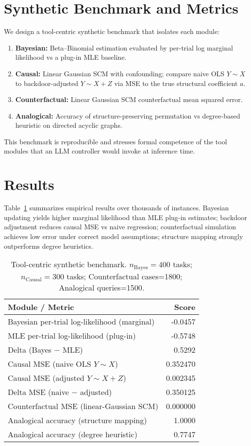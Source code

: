 \documentclass[11pt]{article}
\begin{document}
\section{Synthetic Benchmark and Metrics}
We design a tool-centric synthetic benchmark that isolates each module:
\begin{enumerate}
\item \textbf{Bayesian:} Beta--Binomial estimation evaluated by per-trial log marginal likelihood vs a plug-in MLE baseline.
\item \textbf{Causal:} Linear Gaussian SCM with confounding; compare naive OLS $Y\!\sim\!X$ to backdoor-adjusted $Y\!\sim\!X{+}Z$ via MSE to the true structural coefficient $a$.
\item \textbf{Counterfactual:} Linear Gaussian SCM counterfactual mean squared error.
\item \textbf{Analogical:} Accuracy of structure-preserving permutation vs degree-based heuristic on directed acyclic graphs.
\end{enumerate}
This benchmark is reproducible and stresses formal competence of the tool modules that an LLM controller would invoke at inference time.

\section{Results}
Table~\ref{tab:results} summarizes empirical results over thousands of instances. Bayesian updating yields higher marginal likelihood than MLE plug-in estimates; backdoor adjustment reduces causal MSE vs naive regression; counterfactual simulation achieves low error under correct model assumptions; structure mapping strongly outperforms degree heuristics.


\begin{table}[t]
\centering
\begin{tabular}{l r}
\toprule
\textbf{Module / Metric} & \textbf{Score} \\ \midrule
Bayesian per-trial log-likelihood (marginal) & -0.0457 \\
MLE per-trial log-likelihood (plug-in) & -0.5748 \\
Delta (Bayes $-$ MLE) & 0.5292 \\
Causal MSE (naive OLS $Y\!\sim\!X$) & 0.352470 \\
Causal MSE (adjusted $Y\!\sim\!X{+}Z$) & 0.002345 \\
Delta MSE (naive $-$ adjusted) & 0.350125 \\
Counterfactual MSE (linear-Gaussian SCM) & 0.000000 \\
Analogical accuracy (structure mapping) & 1.0000 \\
Analogical accuracy (degree heuristic) & 0.7747 \\
\bottomrule
\end{tabular}
\caption{Tool-centric synthetic benchmark. $n_\text{Bayes}=400$ tasks; $n_\text{Causal}=300$ tasks; Counterfactual cases=1800; Analogical queries=1500.}
\label{tab:results}
\end{table}
\end{document}
